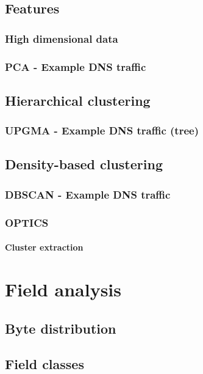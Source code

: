 \documentclass[a4paper]{report}
\begin{document}
\subsection{Features}

\subsubsection{High dimensional data}

\subsubsection{PCA - Example DNS traffic}

\subsection{Hierarchical clustering}

\subsubsection{UPGMA - Example DNS traffic (tree)}

\subsection{Density-based clustering}

\subsubsection{DBSCAN - Example DNS traffic}

\subsubsection{OPTICS}

\paragraph{Cluster extraction}

\section{Field analysis}

\subsection{Byte distribution}

\subsection{Field classes}
\end{document}
